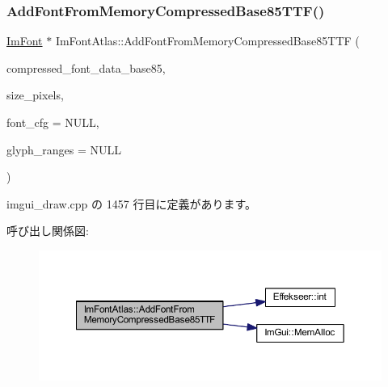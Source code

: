 \subsubsection{\texorpdfstring{Add\+Font\+From\+Memory\+Compressed\+Base85\+T\+T\+F()}{AddFontFromMemoryCompressedBase85TTF()}}
{\footnotesize\ttfamily \mbox{\hyperlink{struct_im_font}{Im\+Font}} $\ast$ Im\+Font\+Atlas\+::\+Add\+Font\+From\+Memory\+Compressed\+Base85\+T\+TF (\begin{DoxyParamCaption}\item[{const char $\ast$}]{compressed\+\_\+font\+\_\+data\+\_\+base85,  }\item[{float}]{size\+\_\+pixels,  }\item[{const \mbox{\hyperlink{struct_im_font_config}{Im\+Font\+Config}} $\ast$}]{font\+\_\+cfg = {\ttfamily NULL},  }\item[{const \mbox{\hyperlink{imgui_8h_af2c7badaf05a0008e15ef76d40875e97}{Im\+Wchar}} $\ast$}]{glyph\+\_\+ranges = {\ttfamily NULL} }\end{DoxyParamCaption})}



 imgui\+\_\+draw.\+cpp の 1457 行目に定義があります。

呼び出し関係図\+:\nopagebreak
\begin{figure}[H]
\begin{center}
\leavevmode
\includegraphics[width=350pt]{struct_im_font_atlas_ab43b930beb57c0b998f42f4586677956_cgraph}
\end{center}
\end{figure}
\mbox{\label{struct_im_font_atlas_a579bb434bd116ea9ac4f892652ccefdb}} 
